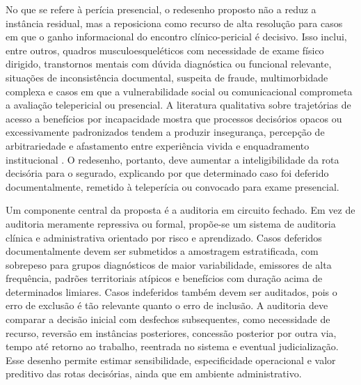 \documentclass[12pt,a4paper]{article}
\begin{document}
No que se refere à perícia presencial, o redesenho proposto não a reduz a instância residual, mas a reposiciona como recurso de alta resolução para casos em que o ganho informacional do encontro clínico-pericial é decisivo. Isso inclui, entre outros, quadros musculoesqueléticos com necessidade de exame físico dirigido, transtornos mentais com dúvida diagnóstica ou funcional relevante, situações de inconsistência documental, suspeita de fraude, multimorbidade complexa e casos em que a vulnerabilidade social ou comunicacional comprometa a avaliação telepericial ou presencial. A literatura qualitativa sobre trajetórias de acesso a benefícios por incapacidade mostra que processos decisórios opacos ou excessivamente padronizados tendem a produzir insegurança, percepção de arbitrariedade e afastamento entre experiência vivida e enquadramento institucional \parencite{sainsbury2006routesontoincapacitybenefitsfindingsfromqualitati, corden2001incapacitybenefitsandworkincentives}. O redesenho, portanto, deve aumentar a inteligibilidade da rota decisória para o segurado, explicando por que determinado caso foi deferido documentalmente, remetido à teleperícia ou convocado para exame presencial.

Um componente central da proposta é a auditoria em circuito fechado. Em vez de auditoria meramente repressiva ou formal, propõe-se um sistema de auditoria clínica e administrativa orientado por risco e aprendizado. Casos deferidos documentalmente devem ser submetidos a amostragem estratificada, com sobrepeso para grupos diagnósticos de maior variabilidade, emissores de alta frequência, padrões territoriais atípicos e benefícios com duração acima de determinados limiares. Casos indeferidos também devem ser auditados, pois o erro de exclusão é tão relevante quanto o erro de inclusão. A auditoria deve comparar a decisão inicial com desfechos subsequentes, como necessidade de recurso, reversão em instâncias posteriores, concessão posterior por outra via, tempo até retorno ao trabalho, reentrada no sistema e eventual judicialização. Esse desenho permite estimar sensibilidade, especificidade operacional e valor preditivo das rotas decisórias, ainda que em ambiente administrativo.
\end{document}
